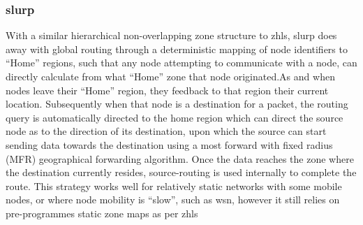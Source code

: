 \subsubsection{\gls{slurp}}
With a similar hierarchical non-overlapping zone structure to \gls{zhls}, \gls{slurp} does away with global routing through a deterministic mapping of node identifiers to ``Home'' regions, such that any node attempting to communicate with a node, can directly calculate from what ``Home'' zone that node originated.As and when nodes leave their ``Home'' region, they feedback to that region their current location. Subsequently when that node is a destination for a packet, the routing query is automatically directed to the home region which can direct the source node as to the direction of its destination, upon which the source can start sending data towards the destination using a most forward with fixed radius (MFR) geographical forwarding algorithm. Once the data reaches the zone where the destination currently resides, source-routing is used internally to complete the route. This strategy works well for relatively static networks with some mobile nodes, or where node mobility is ``slow'', such as \gls{wsn}, however it still relies on pre-programmes static zone maps as per \gls{zhls}\cite{Woo2001}


